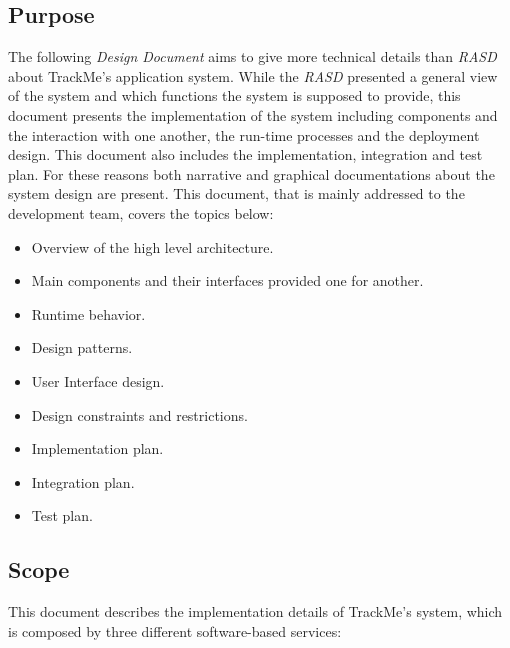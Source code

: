 \subsection{Purpose}
The following \textit{Design Document} aims to give more technical details than \textit{RASD} about TrackMe's application system. While the \textit{RASD} presented a general view of the system and which functions the system is supposed to provide, this document presents the implementation of the system including components and the interaction with one another, the run-time processes and the deployment design. This document also includes the implementation, integration and test plan. For these reasons both narrative and graphical documentations about the system design are present.
\bigbreak
\noindent
This document, that is mainly addressed to the development team, covers the topics below:
\begin{itemize}[noitemsep]
\item Overview of the high level architecture.
\item Main components and their interfaces provided one for another.
\item Runtime behavior.
\item Design patterns.
\item User Interface design.
\item Design constraints and restrictions.
\item Implementation plan.
\item Integration plan.
\item Test plan.
\end{itemize}

\subsection{Scope} 
This document describes the implementation details of TrackMe's system, which is composed by three different software-based services:

